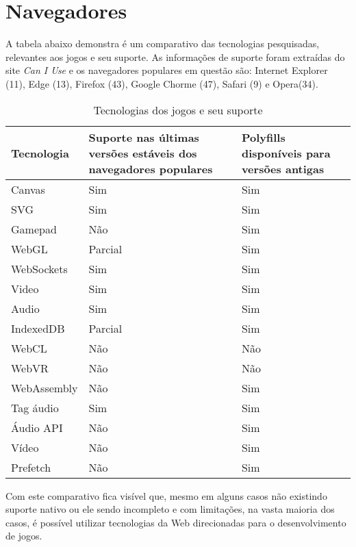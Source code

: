\section{Navegadores}

A tabela abaixo demonstra é um comparativo das tecnologias pesquisadas,
relevantes aos jogos e seu suporte. As informações de suporte foram
extraídas do site \textit{Can I Use} e os navegadores populares em questão
são: Internet Explorer (11), Edge (13), Firefox (43), Google Chorme
(47), Safari (9) e Opera(34).

\begin{table}
\begin{tabular}{ |p{3cm}|p{3cm}|p{3cm}|  }
\hline
Tecnologia & Suporte nas últimas versões estáveis dos navegadores populares & Polyfills disponíveis  para versões antigas \\
\hline
Canvas & Sim & Sim \\
SVG & Sim & Sim \\
Gamepad & Não & Sim \\
WebGL & Parcial & Sim \\
WebSockets & Sim & Sim \\
Video & Sim & Sim \\
Audio & Sim & Sim \\
IndexedDB & Parcial & Sim \\
WebCL & Não & Não \\
WebVR & Não & Não \\
WebAssembly & Não & Sim \\
Tag áudio & Sim & Sim \\
Áudio API & Não & Sim \\
Vídeo & Não & Sim \\
Prefetch & Não & Sim \\
\hline
\end{tabular}
\label{table:technologies}
\caption{Tecnologias dos jogos e seu suporte}
\end{table}

Com este comparativo fica visível que, mesmo em alguns casos não
existindo suporte nativo ou ele sendo incompleto e com limitações,
na vasta maioria dos casos, é possível utilizar tecnologias da Web
direcionadas para o desenvolvimento de jogos.

